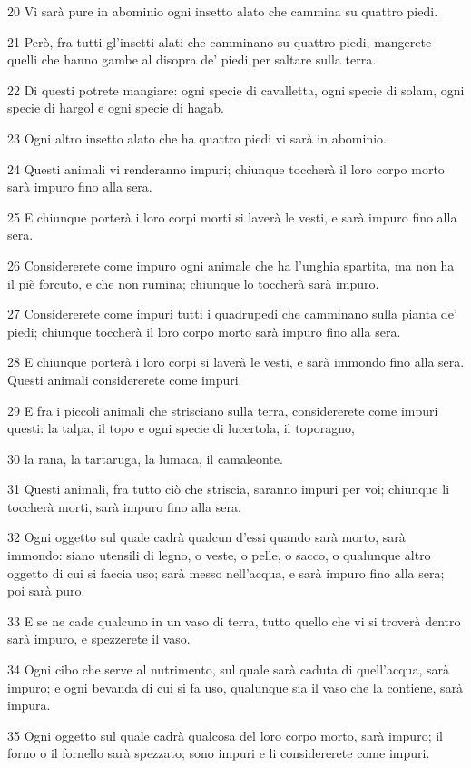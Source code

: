 \par 20 Vi sarà pure in abominio ogni insetto alato che cammina su quattro piedi.
\par 21 Però, fra tutti gl'insetti alati che camminano su quattro piedi, mangerete quelli che hanno gambe al disopra de' piedi per saltare sulla terra.
\par 22 Di questi potrete mangiare: ogni specie di cavalletta, ogni specie di solam, ogni specie di hargol e ogni specie di hagab.
\par 23 Ogni altro insetto alato che ha quattro piedi vi sarà in abominio.
\par 24 Questi animali vi renderanno impuri; chiunque toccherà il loro corpo morto sarà impuro fino alla sera.
\par 25 E chiunque porterà i loro corpi morti si laverà le vesti, e sarà impuro fino alla sera.
\par 26 Considererete come impuro ogni animale che ha l'unghia spartita, ma non ha il piè forcuto, e che non rumina; chiunque lo toccherà sarà impuro.
\par 27 Considererete come impuri tutti i quadrupedi che camminano sulla pianta de' piedi; chiunque toccherà il loro corpo morto sarà impuro fino alla sera.
\par 28 E chiunque porterà i loro corpi si laverà le vesti, e sarà immondo fino alla sera. Questi animali considererete come impuri.
\par 29 E fra i piccoli animali che strisciano sulla terra, considererete come impuri questi: la talpa, il topo e ogni specie di lucertola, il toporagno,
\par 30 la rana, la tartaruga, la lumaca, il camaleonte.
\par 31 Questi animali, fra tutto ciò che striscia, saranno impuri per voi; chiunque li toccherà morti, sarà impuro fino alla sera.
\par 32 Ogni oggetto sul quale cadrà qualcun d'essi quando sarà morto, sarà immondo: siano utensili di legno, o veste, o pelle, o sacco, o qualunque altro oggetto di cui si faccia uso; sarà messo nell'acqua, e sarà impuro fino alla sera; poi sarà puro.
\par 33 E se ne cade qualcuno in un vaso di terra, tutto quello che vi si troverà dentro sarà impuro, e spezzerete il vaso.
\par 34 Ogni cibo che serve al nutrimento, sul quale sarà caduta di quell'acqua, sarà impuro; e ogni bevanda di cui si fa uso, qualunque sia il vaso che la contiene, sarà impura.
\par 35 Ogni oggetto sul quale cadrà qualcosa del loro corpo morto, sarà impuro; il forno o il fornello sarà spezzato; sono impuri e li considererete come impuri.
